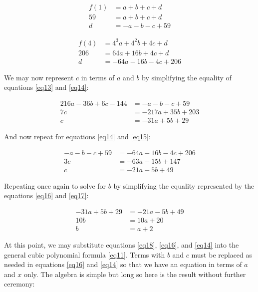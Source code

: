\documentclass[preview,border=3mm]{article}
\begin{document}
\begin{align}
    f(1) &= a + b + c + d \nonumber \\
    59   &= a + b + c + d \nonumber \\
    d    &= -a - b - c + 59\label{eq14}
\end{align}

\begin{align}
    f(4) &= 4^3a + 4^2b + 4c + d \nonumber \\
    206  &= 64a + 16b + 4c + d \nonumber \\
    d    &= -64a - 16b - 4c + 206 \label{eq15}
\end{align}

\noindent
We may now represent $c$ in terms of $a$ and $b$ by simplifying the equality
of equations \ref{eq13} and \ref{eq14}:

\begin{align}
    216a - 36b + 6c - 144 &= -a -b -c + 59 \nonumber \\
    7c &= -217a + 35b + 203 \nonumber \\
    c &= -31a + 5b + 29 \label{eq16}
\end{align}

\noindent
And now repeat for equations \ref{eq14} and \ref{eq15}:

\begin{align}
    -a - b - c + 59 &= -64a - 16b - 4c + 206 \nonumber \\
    3c &= -63a - 15b + 147 \nonumber \\
    c &= -21a - 5b + 49 \label{eq17}
\end{align}

\noindent
Repeating once again to solve for $b$ by simplifying the equality represented
by the equations \ref{eq16} and \ref{eq17}:

\begin{align}
    -31a + 5b + 29 &= -21a - 5b + 49 \nonumber \\
    10b &= 10a + 20 \nonumber \\
    b &= a + 2 \label{eq18}
\end{align}

\noindent
At this point, we may substitute equations \ref{eq18}, \ref{eq16}, and \ref{eq14}
into the general cubic polynomial formula \ref{eq11}. Terms with $b$ and $c$
must be replaced as needed in equations \ref{eq16} and \ref{eq14} so that we
have an equation in terms of $a$ and $x$ only. The algebra is simple but long
so here is the result without further ceremony:
\end{document}
